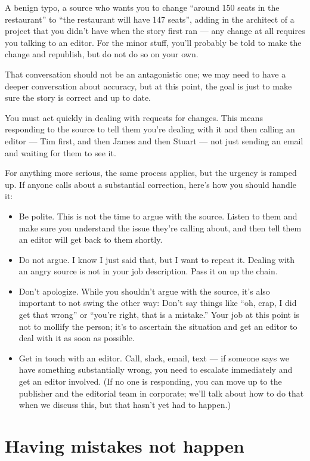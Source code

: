 \documentclass[
  11pt,
  american,
  letterpaperpaper,
  extrafontsizes,onecolumn,openright
  ]{memoir}
\providecommand{\tightlist}{%
  \setlength{\itemsep}{0pt}\setlength{\parskip}{0pt}}
\begin{document}
A benign typo, a source who wants you to change \enquote{around 150 seats in the restaurant} to \enquote{the restaurant will have 147 seats}, adding in the architect of a project that you didn't have when the story first ran --- any change at all requires you talking to an editor. For the minor stuff, you'll probably be told to make the change and republish, but do not do so on your own.

That conversation should not be an antagonistic one; we may need to have a deeper conversation about accuracy, but at this point, the goal is just to make sure the story is correct and up to date.

You must act quickly in dealing with requests for changes. This means responding to the source to tell them you're dealing with it and then calling an editor --- Tim first, and then James and then Stuart --- not just sending an email and waiting for them to see it.

For anything more serious, the same process applies, but the urgency is ramped up. If anyone calls about a substantial correction, here's how you should handle it:

\begin{itemize}
\tightlist
\item
  Be polite. This is not the time to argue with the source. Listen to them and make sure you understand the issue they're calling about, and then tell them an editor will get back to them shortly.
\item
  Do not argue. I know I just said that, but I want to repeat it. Dealing with an angry source is not in your job description. Pass it on up the chain.
\item
  Don't apologize. While you shouldn't argue with the source, it's also important to not swing the other way: Don't say things like \enquote{oh, crap, I did get that wrong} or \enquote{you're right, that is a mistake.} Your job at this point is not to mollify the person; it's to ascertain the situation and get an editor to deal with it as soon as possible.
\item
  Get in touch with an editor. Call, slack, email, text --- if someone says we have something substantially wrong, you need to escalate immediately and get an editor involved. (If no one is responding, you can move up to the publisher and the editorial team in corporate; we'll talk about how to do that when we discuss this, but that hasn't yet had to happen.)
\end{itemize}

\hypertarget{having-mistakes-not-happen}{%
\section*{Having mistakes not happen}\label{having-mistakes-not-happen}}
\end{document}
